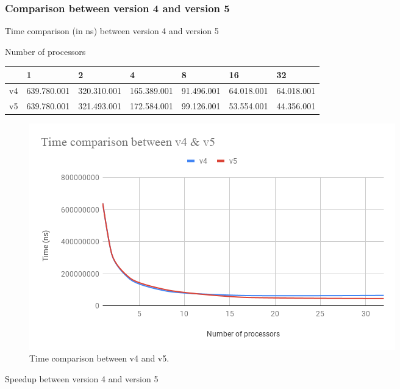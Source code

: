 \documentclass[12]{article}
\begin{document}
\subsubsection{Comparison between version 4 and version 5}


\begin{large}
\begin{center}
Time comparison (in ns) between version 4 and version 5
\end{center}
\end{large}
\begin{table}[h]
\begin{center}
Number of processors 
\end{center}
\begin{tabular}{l|l|l|l|l|l|l|}
\cline{2-7}

                         & 1           & 2           & 4           & 8          & 16         & 32         \\ \hline
\multicolumn{1}{|l|}{v4} & 639.780.001 & 320.310.001 & 165.389.001 & 91.496.001 & 64.018.001 & 64.018.001 \\ \hline
\multicolumn{1}{|l|}{v5} & 639.780.001 & 321.493.001 & 172.584.001 & 99.126.001 & 53.554.001 & 44.356.001 \\ \hline
\end{tabular}
\end{table}

\begin{figure}[H]
\centering  \includegraphics[width=\linewidth]{images/Time.png}
  \caption{Time comparison between v4 and v5.}
  \label{fig:PlotComparison}
\end{figure}

\begin{large}
\begin{center}
Speedup between version 4 and version 5
\end{center}
\end{large}
\end{document}
